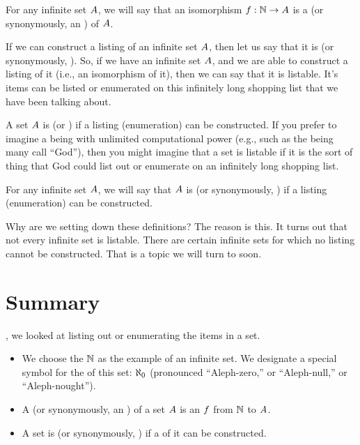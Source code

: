 \documentclass[../../../main.tex]{subfiles}
\begin{document}
\begin{fdefinition}[Listings]
  \label{def:listings}
  For any infinite set $A$, we will say that an isomorphism $\funcsig{f}{\Nats/}{\set{A}}$ is a  (or synonymously, an ) of $A$.
\end{fdefinition}

If we can construct a listing of an infinite set $A$, then let us say that it is  (or synonymously, ). So, if we have an infinite set $A$, and we are able to construct a listing of it (i.e., an isomorphism of it), then we can say that it is listable. It's items can be listed or enumerated on this infinitely long shopping list that we have been talking about.

\begin{terminology}
  A set $A$ is  (or ) if a listing (enumeration) can be constructed. If you prefer to imagine a being with unlimited computational power (e.g., such as the being many call ``God''), then you might imagine that a set is listable if it is the sort of thing that God could list out or enumerate on an infinitely long shopping list.
\end{terminology}

\begin{fdefinition}[Listability]
  \label{def:listability}
  For any infinite set $A$, we will say that $A$ is  (or synonymously, ) if a listing (enumeration) can be constructed.

\end{fdefinition}

Why are we setting down these definitions? The reason is this. It turns out that not every infinite set is listable. There are certain infinite sets for which no listing cannot be constructed. That is a topic we will turn to soon.


\section{Summary}

, we looked at listing out or enumerating the items in a set. 

\begin{itemize}

  \item We choose the  $\Nats/$ as the  example of an infinite set. We designate a special symbol for the  of this set: $\AlephZero/$ (pronounced ``Aleph-zero,'' or ``Aleph-null,'' or ``Aleph-nought''). 

  \item A  (or synonymously, an ) of a set $A$ is an  $f$ from $\Nats/$ to $A$.
  
  \item A set is  (or synonymously, ) if a  of it can be constructed.

\end{itemize}
\end{document}
